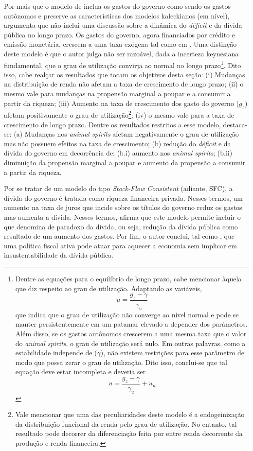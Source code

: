 Por mais que o modelo de \textcite{allain_macroeconomic_2014} inclua os gastos do governo como sendo os gastos autônomos e preserve as características dos modelos kaleckianos (em nível), \textcite{hein_autonomous_2018} argumenta que não inclui uma discussão sobre a dinâmica do \textit{déficit} e da dívida pública no longo prazo. Os gastos do governo, agora financiados por crédito e emissão monetária, crescem a uma taxa exógena tal como em \textcite{allain_macroeconomic_2014}. Uma distinção deste modelo é que o autor julga não ser razoável, dada a incerteza keynesiana fundamental, que o grau de utilização convirja ao normal no longo prazo\footnote{Dentre as equações para o equilíbrio de longo prazo, cabe mencionar àquela que diz respeito ao grau de utilização. Adaptando as variáveis,
$$
u = \frac{g_z - \gamma}{\gamma_u}
$$
que indica que o grau de utilização não converge ao nível normal e pode se manter persistentemente em um patamar elevado a depender dos parâmetros. Além disso, se os gastos autônomos crescerem a uma mesma taxa que o valor do \textit{animal spirits}, o grau de utilização será nulo. Em outras palavras, como a estabilidade independe de ($\gamma$), não existem restrições para esse parâmetro de modo que possa zerar o grau de utilização. Dito isso, conclui-se que tal equação deve estar incompleta e deveria ser
$$
u = \frac{g_z - \gamma}{\gamma_u} + u_n
$$
}. 
Dito isso, cabe realçar os resultados que tocam os objetivos desta seção: (i) Mudanças na distribuição de renda não afetam a taxa de crescimento de longo prazo; (ii) o mesmo vale para mudanças na propensão marginal a poupar e a consumir a partir da riqueza; (iii) Aumento na taxa de crescimento dos gasto do governo ($g_z$) afetam positivamente o grau de utilização\footnote{Vale mencionar que uma das peculiaridades deste modelo é a endogeinização da distribuição funcional da renda pelo grau de utilização. No entanto, tal resultado pode decorrer da diferenciação feita por \textcite{hein_autonomous_2018} entre renda decorrente da produção e renda financeira.}; (iv) o mesmo vale para a taxa de crescimento de longo prazo. Dentre os resultados restritos a esse modelo, destaca-se:  (a) Mudanças nos \textit{animal spirits} afetam negativamente o grau de utilização mas não possuem efeitos na taxa de crescimento; (b) redução do \textit{déficit} e da dívida do governo em decorrência de: (b.i) aumento nos \textit{animal spirits}; (b.ii) diminuição da propensão marginal a poupar e aumento da propensão a consumir a partir da riqueza. 

Por se tratar de um modelo do tipo \textit{Stock-Flow Consistent} (adiante, SFC), a dívida do governo é tratada como riqueza financeira privada. Nesses termos, um aumento na taxa de juros que incide sobre os títulos do governo reduz os gastos mas aumenta a dívida. Nesses termos, \textcite{hein_autonomous_2018} afirma que este modelo permite incluir o que denomina de paradoxo da dívida, ou seja, redução da dívida pública como resultado de um aumento dos gastos. Por fim, o autor conclui, tal como \textcite{arestis_effectiveness_2012}, que uma política fiscal ativa pode atuar para aquecer a economia sem implicar em insustentabilidade da dívida pública.

